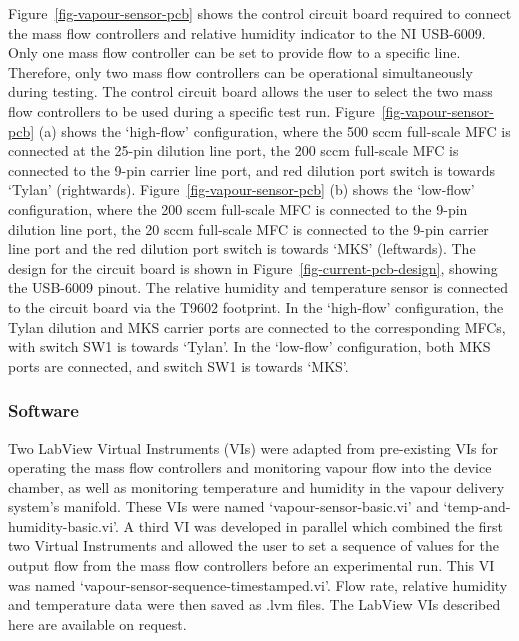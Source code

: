 \documentclass[
  a4paper,
]{scrbook}
\begin{document}
Figure~\ref{fig-vapour-sensor-pcb} shows the control circuit board
required to connect the mass flow controllers and relative humidity
indicator to the NI USB-6009. Only one mass flow controller can be set
to provide flow to a specific line. Therefore, only two mass flow
controllers can be operational simultaneously during testing. The
control circuit board allows the user to select the two mass flow
controllers to be used during a specific test run.
Figure~\ref{fig-vapour-sensor-pcb} (a) shows the `high-flow'
configuration, where the 500 sccm full-scale MFC is connected at the
25-pin dilution line port, the 200 sccm full-scale MFC is connected to
the 9-pin carrier line port, and red dilution port switch is towards
`Tylan' (rightwards). Figure~\ref{fig-vapour-sensor-pcb} (b) shows the
`low-flow' configuration, where the 200 sccm full-scale MFC is connected
to the 9-pin dilution line port, the 20 sccm full-scale MFC is connected
to the 9-pin carrier line port and the red dilution port switch is
towards `MKS' (leftwards). The design for the circuit board is shown in
Figure~\ref{fig-current-pcb-design}, showing the USB-6009 pinout. The
relative humidity and temperature sensor is connected to the circuit
board via the T9602 footprint. In the `high-flow' configuration, the
Tylan dilution and MKS carrier ports are connected to the corresponding
MFCs, with switch SW1 is towards `Tylan'. In the `low-flow'
configuration, both MKS ports are connected, and switch SW1 is towards
`MKS'.

\hypertarget{software}{%
\subsubsection*{Software}\label{software}}

Two LabView Virtual Instruments (VIs) were adapted from pre-existing VIs
for operating the mass flow controllers and monitoring vapour flow into
the device chamber, as well as monitoring temperature and humidity in
the vapour delivery system's manifold. These VIs were named
`vapour-sensor-basic.vi' and `temp-and-humidity-basic.vi'. A third VI
was developed in parallel which combined the first two Virtual
Instruments and allowed the user to set a sequence of values for the
output flow from the mass flow controllers before an experimental run.
This VI was named `vapour-sensor-sequence-timestamped.vi'. Flow rate,
relative humidity and temperature data were then saved as .lvm files.
The LabView VIs described here are available on request.
\end{document}
